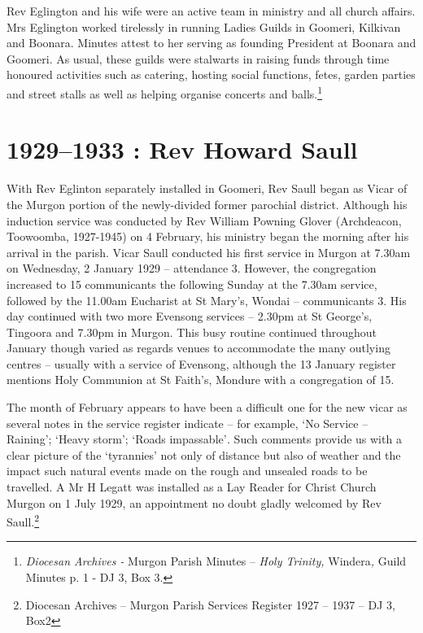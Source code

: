 Rev Eglington and his wife were an active team in ministry and all church affairs. Mrs Eglington worked tirelessly in running Ladies Guilds in Goomeri, Kilkivan and Boonara. Minutes attest to her serving as founding President at Boonara and Goomeri. As usual, these guilds were stalwarts in raising funds through time honoured activities such as catering, hosting social functions, fetes, garden parties and street stalls as well as helping organise concerts and balls.\footnote{\emph{Diocesan Archives -} Murgon Parish Minutes -- \emph{Holy Trinity,} Windera\emph{,} Guild Minutes p. 1 - DJ 3, Box 3.}

\hypertarget{rev-howard-saull}{%
\chapter{1929--1933 : Rev Howard Saull}\label{rev-howard-saull}}

With Rev Eglinton separately installed in Goomeri, Rev Saull began as Vicar of the Murgon portion of the newly-divided former parochial district. Although his induction service was conducted by Rev William Powning Glover (Archdeacon, Toowoomba, 1927-1945) on 4 February, his ministry began the morning after his arrival in the parish. Vicar Saull conducted his first service in Murgon at 7.30am on Wednesday, 2 January 1929 -- attendance 3. However, the congregation increased to 15 communicants the following Sunday at the 7.30am service, followed by the 11.00am Eucharist at St Mary's, Wondai -- communicants 3. His day continued with two more Evensong services -- 2.30pm at St George's, Tingoora and 7.30pm in Murgon. This busy routine continued throughout January though varied as regards venues to accommodate the many outlying centres -- usually with a service of Evensong, although the 13 January register mentions Holy Communion at St Faith's, Mondure with a congregation of 15.

The month of February appears to have been a difficult one for the new vicar as several notes in the service register indicate -- for example, `No Service -- Raining'; `Heavy storm'; `Roads impassable'\emph{.} Such comments provide us with a clear picture of the `tyrannies' not only of distance but also of weather and the impact such natural events made on the rough and unsealed roads to be travelled. A Mr H Legatt was installed as a Lay Reader for Christ Church Murgon on 1 July 1929, an appointment no doubt gladly welcomed by Rev Saull.\footnote{Diocesan Archives -- Murgon Parish Services Register 1927 -- 1937 -- DJ 3, Box2}

